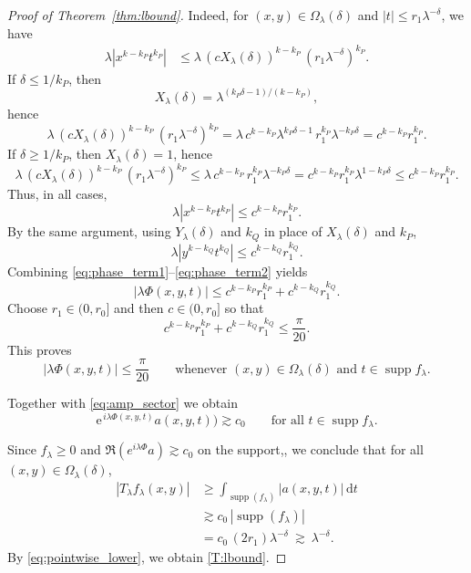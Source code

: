 \documentclass[10pt,a4paper]{amsart}
\newcommand{\e}{\mathrm{e}}
\newcommand{\supp}{\operatorname{supp}}
\begin{document}
\begin{proof}[Proof of Theorem~\ref{thm:lbound}]
		Indeed, for $(x,y)\in\Omega_\lambda(\delta)$ and $|t|\le r_1\lambda^{-\delta}$, we have
		\begin{align*}
			\lambda|x^{k-k_P}t^{k_P}|
			&\le \lambda\,(cX_\lambda(\delta))^{k-k_P}\,(r_1\lambda^{-\delta})^{k_P}.
		\end{align*}
		If $\delta\le 1/k_P$, then
		\[
		X_\lambda(\delta)=\lambda^{(k_P\delta-1)/(k-k_P)},
		\]
		hence
		\[
		\lambda\,(cX_\lambda(\delta))^{k-k_P}\,(r_1\lambda^{-\delta})^{k_P}
		=\lambda\,c^{k-k_P}\lambda^{k_P\delta-1}\,r_1^{k_P}\lambda^{-k_P\delta}
		=c^{k-k_P}r_1^{k_P}.
		\]
		If $\delta\ge 1/k_P$, then $X_\lambda(\delta)=1$, hence
		\[
		\lambda\,(cX_\lambda(\delta))^{k-k_P}\,(r_1\lambda^{-\delta})^{k_P}
		\le \lambda\,c^{k-k_P}\,r_1^{k_P}\lambda^{-k_P\delta}
		=c^{k-k_P}r_1^{k_P}\lambda^{1-k_P\delta}
		\le c^{k-k_P}r_1^{k_P}.
		\]
		Thus, in all cases,
		\begin{equation}\label{eq:phase_term1}
			\lambda|x^{k-k_P}t^{k_P}|\le c^{k-k_P}r_1^{k_P}.
		\end{equation}
		By the same argument, using $Y_\lambda(\delta)$ and $k_Q$ in place of $X_\lambda(\delta)$ and $k_P$,
		\begin{equation}\label{eq:phase_term2}
			\lambda|y^{k-k_Q}t^{k_Q}|\le c^{k-k_Q}r_1^{k_Q}.
		\end{equation}
		Combining \eqref{eq:phase_term1}--\eqref{eq:phase_term2} yields
		\[
		|\lambda\Phi(x,y,t)|
		\le c^{k-k_P}r_1^{k_P}+c^{k-k_Q}r_1^{k_Q}.
		\]
		Choose $r_1\in(0,r_0]$ and then $c\in(0,r_0]$ so that
		\[
		c^{k-k_P}r_1^{k_P}+c^{k-k_Q}r_1^{k_Q}\le \frac{\pi}{20}.
		\]
		This proves \begin{equation*}
		 	|\lambda\Phi(x,y,t)|\le \frac{\pi}{20}
		 	\qquad\text{whenever }(x,y)\in\Omega_\lambda(\delta)\text{ and }t\in\supp f_\lambda.
		 \end{equation*}
		
	
		Together with \eqref{eq:amp_sector} we obtain
		\begin{equation*}
			\e^{\,i\lambda\Phi(x,y,t)}a(x,y,t)\bigr)
			\gtrsim c_0
			\qquad \text{for all }t\in\supp f_\lambda.
		\end{equation*}

		Since
        $f_\lambda\ge0$
        and
        $\Re(e^{i\lambda\Phi}a)\gtrsim c_0$
        on the support,, we conclude that for all
		$(x,y)\in\Omega_\lambda(\delta)$,
		\begin{align}
			|T_\lambda f_\lambda(x,y)|
			&\ge
			 \int_{\supp (f_\lambda)}|a(x,y,t)|\,\mathrm dt\nonumber\\
			&\gtrsim c_0\,|\supp (f_\lambda)|\nonumber\\
			&= c_0\,(2r_1)\lambda^{-\delta}
			\ \gtrsim\ \lambda^{-\delta}.\label{eq:pointwise_lower}
		\end{align}
		By \eqref{eq:pointwise_lower}, we obtain \eqref{T:lbound}.
		

\end{proof}
\end{document}
